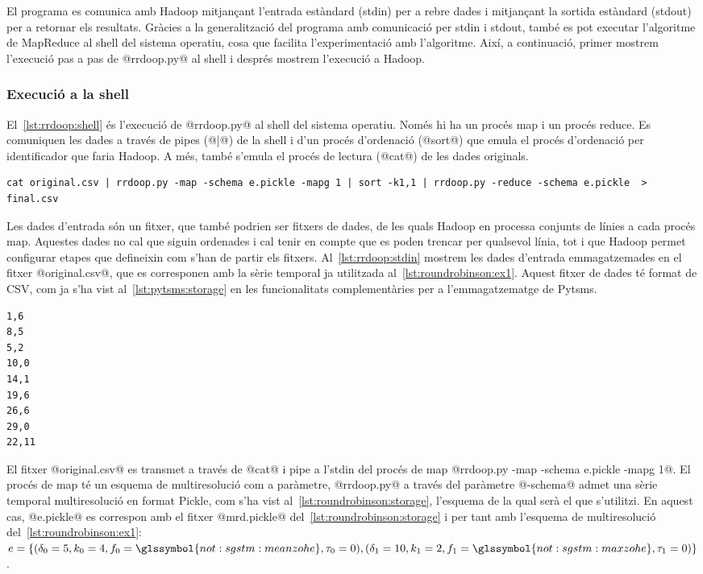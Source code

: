 El programa es comunica amb Hadoop mitjançant l'entrada estàndard
(stdin) per a rebre dades i mitjançant la sortida estàndard (stdout)
per a retornar els resultats.  Gràcies a la generalització del
programa amb comunicació per stdin i stdout, també es pot executar
l'algoritme de MapReduce al shell del sistema operatiu, cosa que
facilita l'experimentació amb l'algoritme.  Així, a continuació,
primer mostrem l'execució pas a pas de @rrdoop.py@ al shell i després
mostrem l'execució a Hadoop.



\subsubsection{Execució a la shell}

El~\autoref{lst:rrdoop:shell} és l'execució de
@rrdoop.py@ al shell del sistema operatiu. Només hi ha un procés map i
un procés reduce. Es comuniquen les dades a través de pipes (@|@) de la
shell i d'un procés d'ordenació (@sort@) que emula el procés
d'ordenació per identificador que faria Hadoop. A més, també s'emula
el procés de lectura (@cat@) de les dades originals.

\begin{lstlisting}[style=sh,caption=Execució a la shell de
  rrdoop.py,label=lst:rrdoop:shell]
cat original.csv | rrdoop.py -map -schema e.pickle -mapg 1 | sort -k1,1 | rrdoop.py -reduce -schema e.pickle  > final.csv
\end{lstlisting}


Les dades d'entrada són un fitxer, que també podrien ser fitxers de
dades, de les quals Hadoop en processa conjunts de línies a cada
procés map. Aquestes dades no cal que siguin ordenades i cal tenir en
compte que es poden trencar per qualsevol línia, tot i que Hadoop
permet configurar etapes que defineixin com s'han de partir els
fitxers.  Al~\autoref{lst:rrdoop:stdin} mostrem les dades d'entrada
emmagatzemades en el fitxer @original.csv@, que es corresponen
amb la sèrie temporal ja utilitzada
al~\autoref{lst:roundrobinson:ex1}.  Aquest fitxer de dades té format
de \gls{CSV}, com ja s'ha vist al~\autoref{lst:pytsms:storage} en les
funcionalitats complementàries per a l'emmagatzematge de Pytsms.
\begin{lstlisting}[style=file,caption=Dades d'entrada original.csv,label=lst:rrdoop:stdin]
1,6
8,5
5,2
10,0
14,1
19,6
26,6
29,0
22,11
\end{lstlisting}


El fitxer @original.csv@ es transmet a través de @cat@ i pipe a
l'stdin del procés de map %
@rrdoop.py -map -schema e.pickle -mapg 1@.  El procés de map té un esquema de
multiresolució com a paràmetre, @rrdoop.py@ a través del paràmetre
@-schema@ admet una sèrie temporal multiresolució en format Pickle,
com s'ha vist al~\autoref{lst:roundrobinson:storage}, l'esquema de la
qual serà el que s'utilitzi. En aquest cas, @e.pickle@ es correspon
amb el fitxer @mrd.pickle@ del~\autoref{lst:roundrobinson:storage} i
per tant amb l'esquema de multiresolució
del~\autoref{lst:roundrobinson:ex1}:
$e=\{(\delta_0=5,k_0=4,f_0=\glssymbol{not:sgstm:meanzohe},\tau_0=0),(\delta_1=10,k_1=2,f_1=\glssymbol{not:sgstm:maxzohe},\tau_1=0)\}$.


